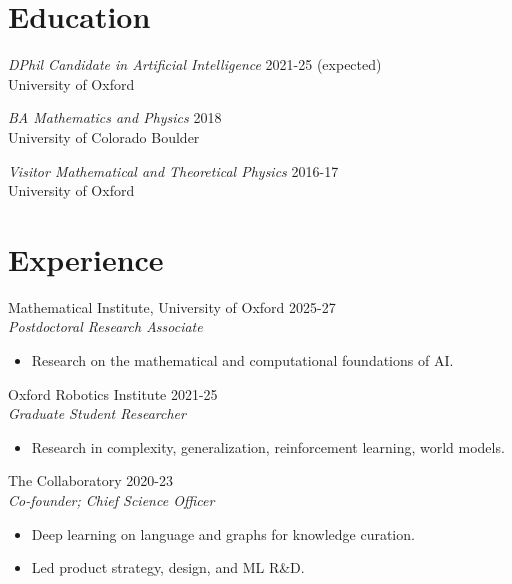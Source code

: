 \documentclass[margin]{res}
\begin{document}
\begin{resume}


    \section{Education} {\sl DPhil Candidate in Artificial Intelligence } \hfill 2021-25 (expected)\\
                University of Oxford

  {\sl BA Mathematics and Physics} \hfill 2018\\
  University of Colorado Boulder

  {\sl Visitor Mathematical and Theoretical Physics} \hfill 2016-17\\
  University of Oxford

  \section{Experience}
  Mathematical Institute, University of Oxford \hfill 2025-27\\
                 {\sl Postdoctoral Research Associate}
                 \begin{itemize}  \itemsep -2pt %
                 \item Research on the mathematical and computational foundations of AI.
                 \end{itemize}

  Oxford Robotics Institute \hfill 2021-25\\
                 {\sl Graduate Student Researcher}
                 \begin{itemize}  \itemsep -2pt %
                 \item Research in complexity, generalization, reinforcement learning, world models.
                 \end{itemize}

                The Collaboratory \hfill 2020-23 \\
                 {\sl Co-founder; Chief Science Officer}
                 \begin{itemize}  \itemsep -2pt %
                 \item Deep learning on language and graphs for knowledge curation.
                 \item Led product strategy, design, and ML R\&D.
                 \end{itemize}


\end{resume}
\end{document}
